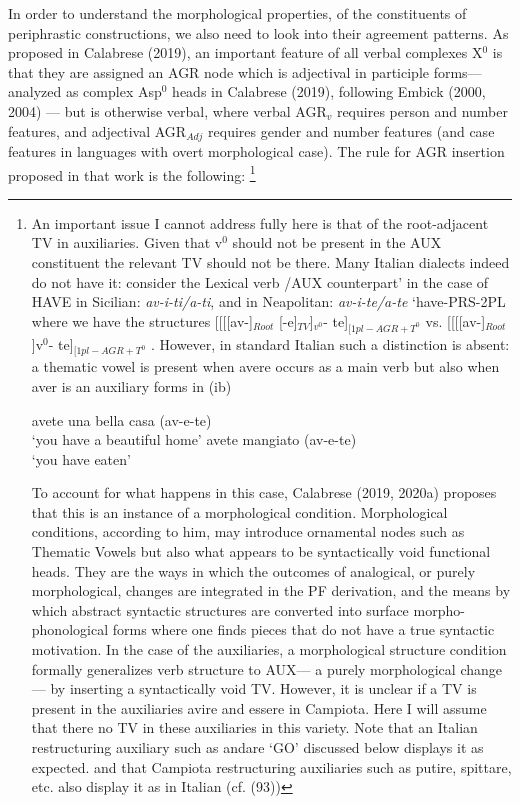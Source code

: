 \documentclass[output=paper,colorlinks,citecolor=brown,
]{langscibook}
\begin{document}
 In order to understand the morphological properties, of the constituents of periphrastic constructions, we also need to look into their agreement patterns.  As proposed in Calabrese (2019), an important feature of all verbal complexes X$^0$ is that they are assigned an AGR node which is adjectival in participle forms— analyzed as complex Asp$^0$ heads in Calabrese (2019), following Embick (2000, 2004) — but is otherwise verbal, where verbal  AGR$_v$ requires person and number features, and adjectival AGR$_{Adj}$ requires gender and number features (and case features in languages with overt morphological case). The rule for AGR insertion proposed in that work is the following: \footnote{An important issue I cannot address fully here is that of the root-adjacent TV in auxiliaries.  Given that v$^0$ should not be present in the AUX constituent the relevant TV should not be there.  Many Italian dialects indeed do not have it: consider the  Lexical verb /AUX counterpart’ in the case of HAVE in Sicilian: \textit{av-i-ti/a-ti}, and  in Neapolitan: \textit{av-i-te/a-te} ‘have-PRS-2PL where we have the structures [[[[av-]$_{Root}$ [-e]$_{TV}$]$_{v^0}$- te]$_{[1pl-AGR+T^0}$  vs. [[[[av-]$_{Root}$ ]v$^0$- te]$_{[1pl-AGR+T^0}$ . However, in standard Italian such a distinction is absent: a thematic vowel is present when avere occurs as a main verb but also when aver is an auxiliary forms in (ib)
 
 \ea
    \ea avete una bella casa (av-e-te)\\
   ‘you have a beautiful home’
    \ex avete mangiato (av-e-te)\\
   ‘you have eaten’
    \z
 \z
 
To account for what happens in this case, Calabrese (2019, 2020a) proposes  that this is an instance of a morphological condition. Morphological conditions, according to him, may introduce ornamental nodes such as Thematic Vowels but also what appears to be syntactically void functional heads. They are the ways in which the outcomes of analogical, or purely morphological, changes are integrated in the PF derivation, and the means by which abstract syntactic structures are converted into surface morpho-phonological forms where one finds pieces that do not have a true syntactic motivation.  In the case of the auxiliaries, a morphological structure condition formally generalizes verb structure to AUX— a purely morphological change — by inserting a syntactically void TV.  However, it is unclear if a TV is present in the auxiliaries avire and essere in Campiota.  Here I will assume that there no TV in these auxiliaries in this variety.  Note that an Italian restructuring auxiliary such as andare ‘GO’ discussed below displays it as expected. and that Campiota restructuring auxiliaries such as putire, spittare, etc. also display it as in Italian (cf. (93))
}
\end{document}
